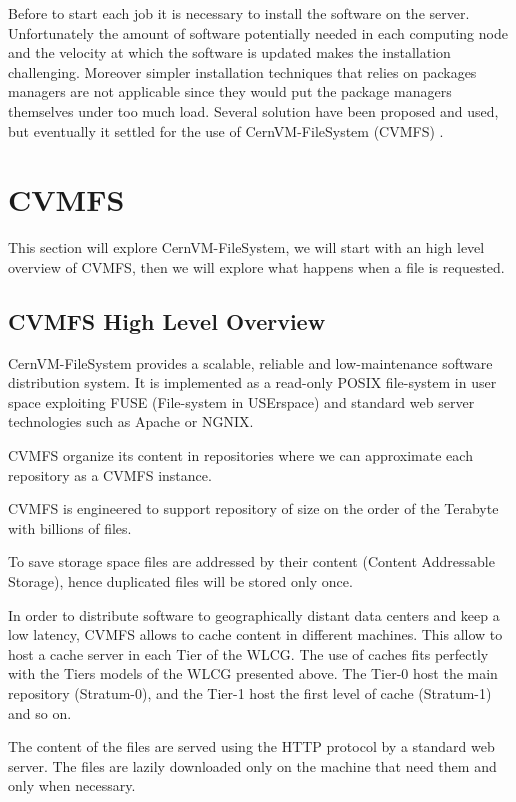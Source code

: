 Before to start each job it is necessary to install the software on the server.
Unfortunately the amount of software potentially needed in each computing node
and the velocity at which the software is updated makes the installation
challenging. Moreover simpler installation techniques that relies on packages
managers are not applicable since they would put the package managers
themselves under too much load. Several solution have been proposed and used,
but eventually it settled for the use of CernVM-FileSystem (CVMFS)
\cite{cvmfs}.

\section{CVMFS}

This section will explore CernVM-FileSystem, we will start with an high level
overview of CVMFS, then we will explore what happens when a file is requested.


\subsection{CVMFS High Level Overview}

CernVM-FileSystem \cite{cvmfs} provides a scalable, reliable and
low-maintenance software distribution system. It is implemented as a read-only
POSIX file-system in user space exploiting FUSE (File-system in USErspace) and
standard web server technologies such as Apache or NGNIX.

CVMFS organize its content in repositories where we can approximate each
repository as a CVMFS instance.

CVMFS is engineered to support repository of size on the order of the Terabyte
with billions of files.

To save storage space files are addressed by their content (Content Addressable
Storage), hence duplicated files will be stored only once.

In order to distribute software to geographically distant data centers and keep
a low latency, CVMFS allows to cache content in different machines. This allow
to host a cache server in each Tier of the WLCG. The use of caches fits
perfectly with the Tiers models of the WLCG presented above. The Tier-0 host
the main repository (Stratum-0), and the Tier-1 host the first level of cache
(Stratum-1) and so on.

The content of the files are served using the HTTP protocol by a standard
web server. The files are lazily downloaded only on the machine that need them
and only when necessary.

